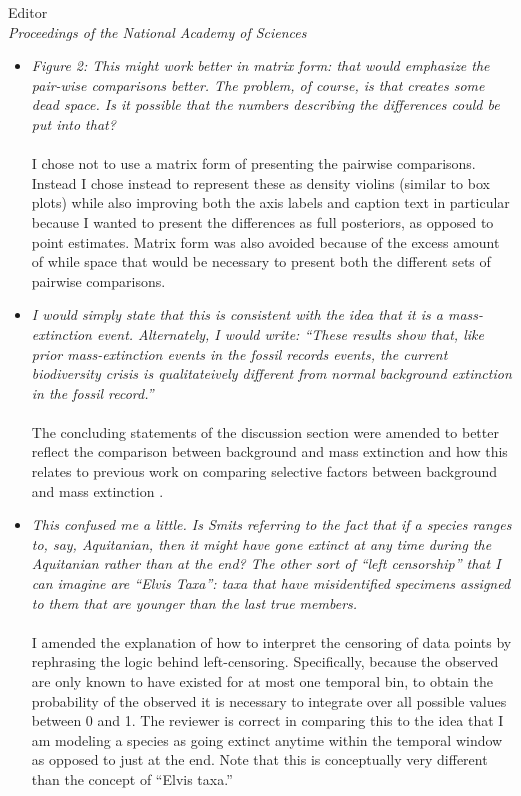 \documentclass{letter}
\begin{document}
\begin{letter}{Editor \\ \textit{Proceedings of the National Academy of Sciences}}
\begin{itemize}
    \item \textit{Figure 2: This might work better in matrix form: that would emphasize the pair-wise comparisons better. The problem, of course, is that creates some dead space. Is it possible that the numbers describing the differences could be put into that?}
      \\\\I chose not to use a matrix form of presenting the pairwise comparisons. Instead I chose instead to represent these as density violins (similar to box plots) while also improving both the axis labels and caption text in particular because I wanted to present the differences as full posteriors, as opposed to point estimates. Matrix form was also avoided because of the excess amount of while space that would be necessary to present both the different sets of pairwise comparisons. 
    \item \textit{I would simply state that this is consistent with the idea that it is a mass-extinction event. Alternately, I would write: ``These results show that, like prior mass-extinction events in the fossil records events, the current biodiversity crisis is qualitateively different from normal background extinction in the fossil record.''}
      \\\\The concluding statements of the discussion section were amended to better reflect the comparison between background and mass extinction and how this relates to previous work on comparing selective factors between background and mass extinction \cite{Jablonski1986}.
    \item \textit{This confused me a little. Is Smits referring to the fact that if a species ranges to, say, Aquitanian, then it might have gone extinct at any time during the Aquitanian rather than at the end? The other sort of ``left censorship'' that I can imagine are ``Elvis Taxa'': taxa that have misidentified specimens assigned to them that are younger than the last true members.}
      \\\\I amended the explanation of how to interpret the censoring of data points by rephrasing the logic behind left-censoring. Specifically, because the observed are only known to have existed for at most one temporal bin, to obtain the probability of the observed it is necessary to integrate over all possible values between 0 and 1. The reviewer is correct in comparing this to the idea that I am modeling a species as going extinct anytime within the temporal window as opposed to just at the end. Note that this is conceptually very different than the concept of ``Elvis taxa.''
  \end{itemize}
  

\end{letter}
\end{document}
